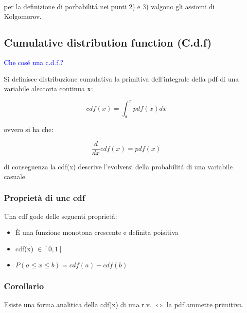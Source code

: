  \noindent per la definizione di porbabilit\'{a} nei punti 2) e 3) valgono gli assiomi di Kolgomorov.
 
 
\begin{figure}[!ht]
	\vspace{0.2in}
    \centering
    \qquad
\end{figure}

\subsection{Cumulative distribution function (C.d.f)}

\textcolor{blue}{Che cos\'{e} una c.d.f.?} \newline

Si definisce distribuzione cumulativa la primitiva dell'integrale della pdf di una variabile aleatoria continua \textbf{x}:

\begin{equation}
	cdf(x) = \int_{a}^{x}{pdf(x)dx}
\end{equation}

\noindent ovvero si ha che:

\begin{equation}
	\dfrac{d}{dx}cdf(x)  = pdf(x)
\end{equation}

di conseguenza la cdf(x) descrive l'evolversi della probabilit\'{a} di una variabile casuale.
\subsubsection{Propriet\`{a} di unc cdf}
Una cdf gode delle seguenti propriet\`{a}:
\begin{itemize}
	\item \`{E} una funzione monotona crescente  e definita poisitiva 
	\item cdf(x) $\in [0,1]$
	\item $P(a \leq x \leq b) = cdf(a) - cdf(b)$ 
\end{itemize}
\subsubsection{Corollario}

Esiste una forma analitica della cdf(x) di una r.v. $\iff$ la pdf ammette primitiva. 

\begin{figure}[!ht]
	\vspace{0.2in}
    \centering
    \qquad
\end{figure}
\newpage
